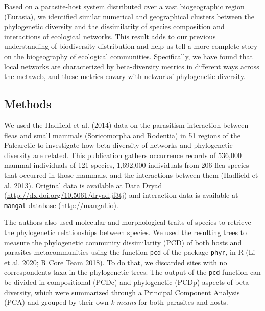 \documentclass[11pt]{article}
\begin{document}
Based on a parasite-host system distributed over a vast biogeographic
region (Eurasia), we identified similar numerical and geographical
clusters between the phylogenetic diversity and the dissimilarity of
species composition and interactions of ecological networks. This result
adds to our previous understanding of biodiversity distribution and help
us tell a more complete story on the biogeography of ecological
communities. Specifically, we have found that local networks are
characterized by beta-diversity metrics in different ways across the
metaweb, and these metrics covary with networks' phylogenetic diversity.

\hypertarget{methods}{%
\subsection{Methods}\label{methods}}

We used the Hadfield et al. (2014) data on the parasitism interaction
between fleas and small mammals (Soricomorpha and Rodentia) in 51
regions of the Palearctic to investigate how beta-diversity of networks
and phylogenetic diversity are related. This publication gathers
occurrence records of 536,000 mammal individuals of 121 species,
1,692,000 individuals from 206 flea species that occurred in those
mammals, and the interactions between them (Hadfield et al. 2013).
Original data is available at Data Dryad
(\url{http://dx.doi.org/10.5061/dryad.jf3tj}) and interaction data is
available at \texttt{mangal} database (\url{http://mangal.io}).

The authors also used molecular and morphological traits of species to
retrieve the phylogenetic relationships between species. We used the
resulting trees to measure the phylogenetic community dissimilarity
(PCD) of both hosts and parasites metacommunities using the function
\texttt{pcd} of the package \texttt{phyr}, in R (Li et al. 2020; R Core
Team 2018). To do that, we discarded sites with no correspondents taxa
in the phylogenetic trees. The output of the \texttt{pcd} function can
be divided in compositional (PCDc) and phylogenetic (PCDp) aspects of
beta-diversity, which were summarized through a Principal Component
Analysis (PCA) and grouped by their own \emph{k-means} for both
parasites and hosts.
\end{document}
